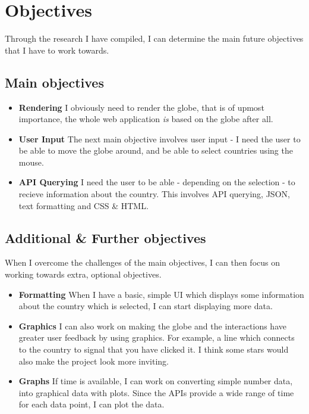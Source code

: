\newpage
\section{Objectives}
Through the research I have compiled, I can determine the main future objectives that I have to work towards.

\subsection{Main objectives}
\begin{itemize}
    \item \textbf{Rendering}
        I obviously need to render the globe, that is of upmost importance, the whole web application \textit{is} based on the globe after all.
    \item \textbf{User Input}
        The next main objective involves user input - I need the user to be able to move the globe around, and be able to select countries using the mouse.
    \item \textbf{API Querying}
        I need the user to be able - depending on the selection - to recieve information about the country. This involves API querying, JSON, text formatting and CSS \& HTML.
\end{itemize}

\subsection{Additional \& Further objectives}
When I overcome the challenges of the main objectives, I can then focus on working towards extra, optional objectives.
\begin{itemize}
    \item \textbf{Formatting}
        When I have a basic, simple UI which displays some information about the country which is selected, I can start displaying more data.
    \item \textbf{Graphics}
        I can also work on making the globe and the interactions have greater user feedback by using graphics. For example, a line which connects to the country to signal that you have clicked it. I think some stars would also make the project look more inviting.
    \item \textbf{Graphs}
        If time is available, I can work on converting simple number data, into graphical data with plots. Since the APIs provide a wide range of time for each data point, I can plot the data.
\end{itemize}

